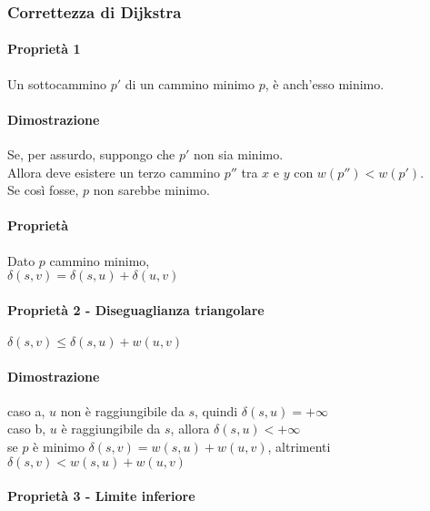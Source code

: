 \subsubsection{Correttezza di Dijkstra}

\paragraph{Proprietà 1}

Un sottocammino $p'$ di un cammino minimo $p$, è anch'esso minimo.

\paragraph{Dimostrazione}

Se, per assurdo, suppongo che $p'$ non sia minimo.\\
Allora deve esistere un terzo cammino $p''$ tra $x$ e $y$ con $w(p'') < w(p')$.\\
Se così fosse, $p$ non sarebbe minimo.

\paragraph{Proprietà}

Dato $p$ cammino minimo, \\
$\delta(s,v)=\delta(s,u)+\delta(u,v)$ \\


\paragraph{Proprietà 2 - Diseguaglianza triangolare}

$\delta(s,v)\leq \delta(s,u)+w(u,v)$ \\

\paragraph{Dimostrazione}

caso a, $u$ non è raggiungibile da $s$, quindi $\delta(s,u) = +\infty$ \\
caso b, $u$ è raggiungibile da $s$, allora $\delta(s,u) < +\infty$ \\

se $p$ è minimo $\delta(s,v)=w(s,u)+w(u,v)$, altrimenti $\delta(s,v)<w(s,u)+w(u,v)$ \\


\paragraph{Proprietà 3 - Limite inferiore}

